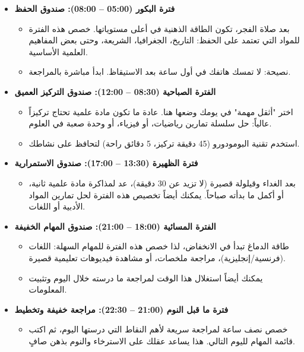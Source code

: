 \documentclass[12pt,a4paper]{book}
\begin{document}
	\begin{itemize}
		\item \textbf{فترة البكور (05:00 – 08:00): صندوق الحفظ}
		\begin{itemize}
			\item بعد صلاة الفجر، تكون الطاقة الذهنية في أعلى مستوياتها. خصص هذه الفترة للمواد التي تعتمد على الحفظ: التاريخ، الجغرافيا، الشريعة، وحتى بعض المفاهيم العلمية الأساسية.
			\item نصيحة: لا تمسك هاتفك في أول ساعة بعد الاستيقاظ. ابدأ مباشرة بالمراجعة.
		\end{itemize}
		
		\item \textbf{الفترة الصباحية (08:30 – 12:00): صندوق التركيز العميق}
		\begin{itemize}
			\item اختر "أثقل مهمة" في يومك وضعها هنا. عادة ما تكون مادة علمية تحتاج تركيزاً عالياً: حل سلسلة تمارين رياضيات، أو فيزياء، أو وحدة صعبة في العلوم.
			\item استخدم تقنية البومودورو (45 دقيقة تركيز، 5 دقائق راحة) لتحافظ على نشاطك.
		\end{itemize}
		
		\item \textbf{فترة الظهيرة (13:30 – 17:00): صندوق الاستمرارية}
		\begin{itemize}
			\item بعد الغداء وقيلولة قصيرة (لا تزيد عن 30 دقيقة)، عد لمذاكرة مادة علمية ثانية، أو أكمل ما بدأته صباحاً. يمكنك أيضاً تخصيص هذه الفترة لحل تمارين المواد الأدبية أو اللغات.
		\end{itemize}
		
		\item \textbf{الفترة المسائية (18:00 – 21:00): صندوق المهام الخفيفة}
		\begin{itemize}
			\item طاقة الدماغ تبدأ في الانخفاض، لذا خصص هذه الفترة للمهام السهلة: اللغات (فرنسية/إنجليزية)، مراجعة ملخصات، أو مشاهدة فيديوهات تعليمية قصيرة.
			\item يمكنك أيضاً استغلال هذا الوقت لمراجعة ما درسته خلال اليوم وتثبيت المعلومات.
		\end{itemize}
		
		\item \textbf{فترة ما قبل النوم (21:00 – 22:30): مراجعة خفيفة وتخطيط}
		\begin{itemize}
			\item خصص نصف ساعة لمراجعة سريعة لأهم النقاط التي درستها اليوم، ثم اكتب قائمة المهام لليوم التالي. هذا يساعد عقلك على الاسترخاء والنوم بذهن صافٍ.
		\end{itemize}
	\end{itemize}
	
\end{document}
